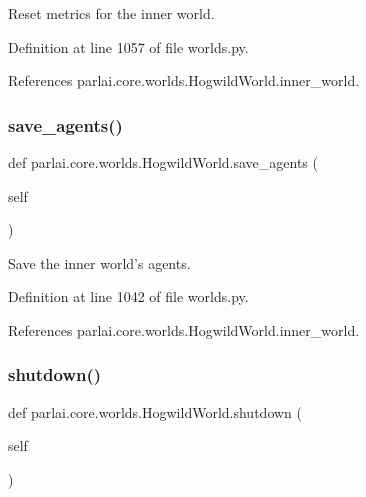 \begin{DoxyVerb}Reset metrics for the inner world.\end{DoxyVerb}
 

Definition at line 1057 of file worlds.\+py.



References parlai.\+core.\+worlds.\+Hogwild\+World.\+inner\+\_\+world.

\mbox{\label{classparlai_1_1core_1_1worlds_1_1HogwildWorld_a1f7e4c566078aebdb5e837c6fed62b17}} 
\subsubsection{\texorpdfstring{save\+\_\+agents()}{save\_agents()}}
{\footnotesize\ttfamily def parlai.\+core.\+worlds.\+Hogwild\+World.\+save\+\_\+agents (\begin{DoxyParamCaption}\item[{}]{self }\end{DoxyParamCaption})}

\begin{DoxyVerb}Save the inner world's agents.\end{DoxyVerb}
 

Definition at line 1042 of file worlds.\+py.



References parlai.\+core.\+worlds.\+Hogwild\+World.\+inner\+\_\+world.

\mbox{\label{classparlai_1_1core_1_1worlds_1_1HogwildWorld_a3960deb08a179884b1eea2e423437db2}} 
\subsubsection{\texorpdfstring{shutdown()}{shutdown()}}
{\footnotesize\ttfamily def parlai.\+core.\+worlds.\+Hogwild\+World.\+shutdown (\begin{DoxyParamCaption}\item[{}]{self }\end{DoxyParamCaption})}

